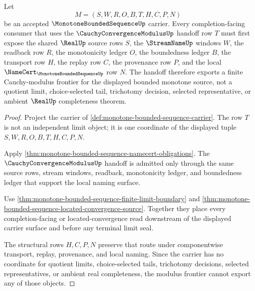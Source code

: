 \begin{theorem}
\label{thm:monotone-bounded-sequence-cauchy-modulus-frontier}
Let
$$
M=(S,W,R,O,B,T,H,C,P,N)
$$
be an accepted $\MonotoneBoundedSequenceUp$ carrier. Every completion-facing consumer that uses the $\CauchyConvergenceModulusUp$ handoff row $T$ must first expose the shared $\RealUp$ source rows $S$, the $\StreamNameUp$ windows $W$, the readback row $R$, the monotonicity ledger $O$, the boundedness ledger $B$, the transport row $H$, the replay row $C$, the provenance row $P$, and the local $\NameCert_{\MonotoneBoundedSequenceUp}$ row $N$. The handoff therefore exports a finite Cauchy-modulus frontier for the displayed bounded monotone source, not a quotient limit, choice-selected tail, trichotomy decision, selected representative, or ambient $\RealUp$ completeness theorem.
\end{theorem}
\begin{proof}
Project the carrier of \autoref{def:monotone-bounded-sequence-carrier}. The row $T$ is not an independent limit object; it is one coordinate of the displayed tuple $S,W,R,O,B,T,H,C,P,N$.

Apply \autoref{thm:monotone-bounded-sequence-namecert-obligations}. The $\CauchyConvergenceModulusUp$ handoff is admitted only through the same source rows, stream windows, readback, monotonicity ledger, and boundedness ledger that support the local naming surface.

Use \autoref{thm:monotone-bounded-sequence-finite-limit-boundary} and \autoref{thm:monotone-bounded-sequence-located-convergence-source}. Together they place every completion-facing or located-convergence read downstream of the displayed carrier surface and before any terminal limit seal.

The structural rows $H,C,P,N$ preserve that route under componentwise transport, replay, provenance, and local naming. Since the carrier has no coordinate for quotient limits, choice-selected tails, trichotomy decisions, selected representatives, or ambient real completeness, the modulus frontier cannot export any of those objects.
\end{proof}


